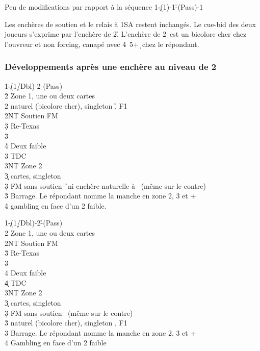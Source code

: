\documentclass[a4paper]{article}
\begin{document}
Peu de modifications par rapport à la séquence
1\c -(1\d )-1\h -(Pass)-1\s 

Les enchères de soutien et le relais à 1SA restent inchangés.
Le cue-bid des deux joueurs s’exprime par l’enchère de 2\h .
L’enchère de 2\d\ est un bicolore cher chez l’ouvreur et non forcing, canapé avec 4\s\ 5+\d\ chez le 
répondant.

\subsubsection{Développements après une enchère au niveau de 2}

\begin{bidtable}
1\c-(1\d/Dbl)-2\d-(Pass)\\
2\h \> Zone 1, une ou deux cartes\\
2\s \> naturel (bicolore cher), singleton \h , F1\\
2NT \> Soutien FM\+\\
3\d \> Re-Texas\+\\
3\h\+\\
4\h \> Deux faible\\
3\s \> TDC\\
3NT \> Zone 2\-\-\-\\
3\c {} cartes, singleton \h \\
3\d \> FM sans soutien \h\ ni enchère naturelle à \s\ (même sur le contre)\\
3\h \> Barrage. Le répondant nomme la manche en zone 2, 3 et +\\
4\h \> gambling en face d'un 2 faible.
\end{bidtable}

\begin{bidtable}
1\c-(1\d/Dbl)-2\h-(Pass)\\
2\s \> Zone 1, une ou deux cartes\\
2NT \> Soutien FM\+\\
3\h \> Re-Texas\+\\
3\s\+\\
4\s \> Deux faible\\
4\c \> TDC\\
3NT \> Zone 2\-\-\-\\
3\c {} cartes, singleton \s \\
3\d \> FM sans soutien \s\ (même sur le contre)\\
3\h \> naturel (bicolore cher), singleton \s , F1\\
3\s \> Barrage. Le répondant nomme la manche en zone 2, 3 et +\\
4\s \> Gambling en face d'un 2 faible
\end{bidtable}
\end{document}

